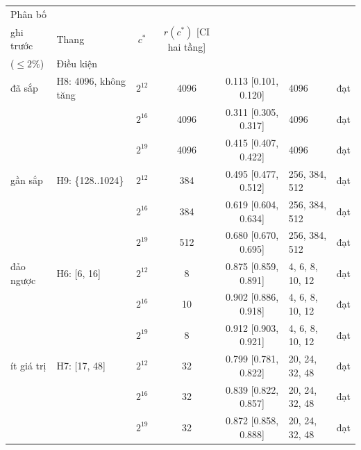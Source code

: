 \setlength{\tabcolsep}{3pt}
\begin{tabular}{llccclc}
\toprule
Phân bố & \makecell{{Dự đoán} \\ {ghi trước}} & Thang & $c^*$ & $r(c^*)$ [CI hai tầng] & \makecell{{Gần tối ưu} \\ {($\le2\%$)}} & Điều kiện \\
\midrule
đã sắp & H8: 4096, không tăng & $2^{12}$ & 4096 & 0.113 [0.101, 0.120] & 4096 & đạt \\
 &  & $2^{16}$ & 4096 & 0.311 [0.305, 0.317] & 4096 & đạt \\
 &  & $2^{19}$ & 4096 & 0.415 [0.407, 0.422] & 4096 & đạt \\
\addlinespace
gần sắp & H9: \{128..1024\} & $2^{12}$ & 384 & 0.495 [0.477, 0.512] & 256, 384, 512 & đạt \\
 &  & $2^{16}$ & 384 & 0.619 [0.604, 0.634] & 256, 384, 512 & đạt \\
 &  & $2^{19}$ & 512 & 0.680 [0.670, 0.695] & 256, 384, 512 & đạt \\
\addlinespace
đảo ngược & H6: [6, 16] & $2^{12}$ & 8 & 0.875 [0.859, 0.891] & 4, 6, 8, 10, 12 & đạt \\
 &  & $2^{16}$ & 10 & 0.902 [0.886, 0.918] & 4, 6, 8, 10, 12 & đạt \\
 &  & $2^{19}$ & 8 & 0.912 [0.903, 0.921] & 4, 6, 8, 10, 12 & đạt \\
\addlinespace
ít giá trị & H7: [17, 48] & $2^{12}$ & 32 & 0.799 [0.781, 0.822] & 20, 24, 32, 48 & đạt \\
 &  & $2^{16}$ & 32 & 0.839 [0.822, 0.857] & 20, 24, 32, 48 & đạt \\
 &  & $2^{19}$ & 32 & 0.872 [0.858, 0.888] & 20, 24, 32, 48 & đạt \\
\bottomrule
\end{tabular}
